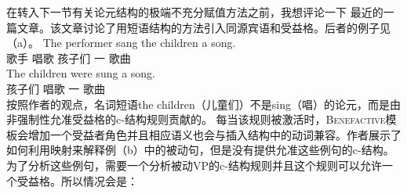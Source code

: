 \addlines
    在转入下一节有关论元结构的极端不充分赋值方法之前，我想评论一下 \citet*{AGT2014a}最近的一篇文章。该文章讨论了用短语结构的方法引入同源宾语和受益格。后者的例子见（a）。
\eal
\ex 
\gll The performer sang the children a song.\\
      歌手 唱歌  孩子们 一 歌曲\\
\ex 
\gll The children were sung a song.\\
      孩子们 \passivepst{} 唱歌 一 歌曲\\
\zl
按照作者的观点，名词短语the children（儿童们）不是sing（唱）的论元，而是由非强制性允准受益格的c-结构规则贡献的。
\ea\label{c-struc-vp-benefactive}
\z
每当该规则被激活时，\textsc{Benefactive}模板会增加一个受益者角色并且相应语义也会与插入结构中的动词兼容。作者展示了如何利用映射来解释例（b）中的被动句，但是没有提供允准这些例句的c-结构。为了分析这些例句，需要一个分析被动VP的c-结构规则并且这个规则可以允许一个受益格。所以情况会是：
